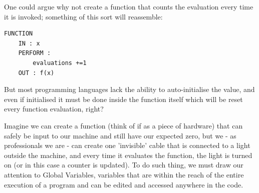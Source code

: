 



One could argue why not create a function that counts the evaluation every time it is invoked; something of this sort will reassemble: 
\begin{lstlisting}
FUNCTION 
    IN : x
    PERFORM : 
        evaluations +=1
    OUT : f(x)
\end{lstlisting}

But most programming languages lack the ability to auto-initialise the value, and even if initialised it must be done inside the function itself which will be reset every function evaluation, right?

Imagine we can create a function (think of if as a piece of hardware) that can safely be input to our machine and still have our expected zero, but we - as professionals we are - can create one 'invisible' cable that is connected to a light outside the machine, and every time it evaluates the function, the light is turned on (or in this case a counter is updated). To do such thing, we must draw our attention to Global Variables, variables that are within the reach of the entire execution of a program and can be edited and accessed anywhere in the code. 

